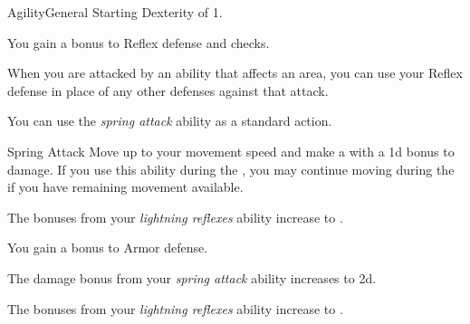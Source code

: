    \begin{feat}{Agility}{General}
        \featpre Starting Dexterity of 1.

         You gain a  bonus to Reflex defense and  checks.

         When you are attacked by an ability that affects an area, you can use your Reflex defense in place of any other defenses against that attack.

         You can use the \textit{spring attack} ability as a standard action.
        \begin{apability}{Spring Attack}
            Move up to your movement speed and make a  with a \plus1d bonus to damage.
            If you use this ability during the , you may continue moving during the  if you have remaining movement available.
        \end{apability}

         The bonuses from your \textit{lightning reflexes} ability increase to .

         You gain a  bonus to Armor defense.

         The damage bonus from your \textit{spring attack} ability increases to \plus2d.

         The bonuses from your \textit{lightning reflexes} ability increase to .
    \end{feat}

